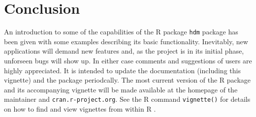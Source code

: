 \documentclass{amsart}
\newcommand{\R}{{\normalfont\textsf{R }}{}}
\begin{document}
\section{Conclusion}

An introduction to some of the capabilities of the \R package \texttt{hdm}
package has been given with some examples describing its basic functionality. Inevitably, new applications will
demand new features and, as the project is in its initial phase, unforseen bugs will show up. In either case comments and suggestions of users are highly appreciated. It is intended to update the documentation (including this vignette) and the package periodcally. The most current version of the \R package and its accompanying vignette will be made available at the homepage of the maintainer and \texttt{cran.r-project.org}. See the \R command \texttt{vignette()} for details on how to find
and view vignettes from within \R.



\footnotesize


\end{document}
